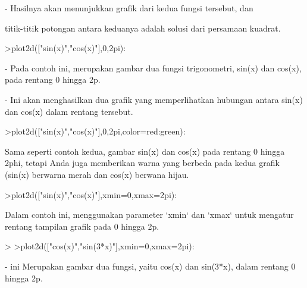 \documentclass[a4paper,10pt]{article}
\begin{document}
\begin{eulernotebook}
\begin{eulercomment}
\begin{eulercomment}
\begin{eulercomment}
\end{eulercomment}
\begin{eulerttcomment}
 - Hasilnya akan menunjukkan grafik dari kedua fungsi tersebut, dan
\end{eulerttcomment}
\begin{eulercomment}
titik-titik potongan antara keduanya adalah solusi dari persamaan
kuadrat.
\end{eulercomment}
\begin{eulerprompt}
>plot2d(["sin(x)","cos(x)"],0,2pi):
\end{eulerprompt}
\begin{eulercomment}
- Pada contoh ini, merupakan gambar dua fungsi trigonometri, sin(x)
dan cos(x), pada rentang 0 hingga 2p.

- Ini akan menghasilkan dua grafik yang memperlihatkan hubungan antara
sin(x) dan cos(x) dalam rentang tersebut.
\end{eulercomment}
\begin{eulerprompt}
>plot2d(["sin(x)","cos(x)"],0,2pi,color=red:green):
\end{eulerprompt}
\begin{eulercomment}
Sama seperti contoh kedua, gambar sin(x) dan cos(x) pada rentang 0
hingga 2phi, tetapi Anda juga memberikan warna yang berbeda pada kedua
grafik (sin(x) berwarna merah dan cos(x) berwana hijau.
\end{eulercomment}
\begin{eulerprompt}
>plot2d(["sin(x)","cos(x)"],xmin=0,xmax=2pi):
\end{eulerprompt}
\begin{eulercomment}
Dalam contoh ini, menggunakan parameter `xmin` dan `xmax` untuk
mengatur rentang tampilan grafik pada 0 hingga 2p.

\end{eulercomment}
\begin{eulerprompt}
> 
>plot2d(["cos(x)","sin(3*x)"],xmin=0,xmax=2pi):
\end{eulerprompt}
\begin{eulercomment}
- ini Merupakan gambar dua fungsi, yaitu cos(x) dan sin(3*x), dalam
rentang 0 hingga 2p.\\
\end{eulercomment}
\begin{eulerttcomment}
  

\end{eulerttcomment}
\end{eulercomment}
\end{eulercomment}
\end{eulernotebook}
\end{document}
